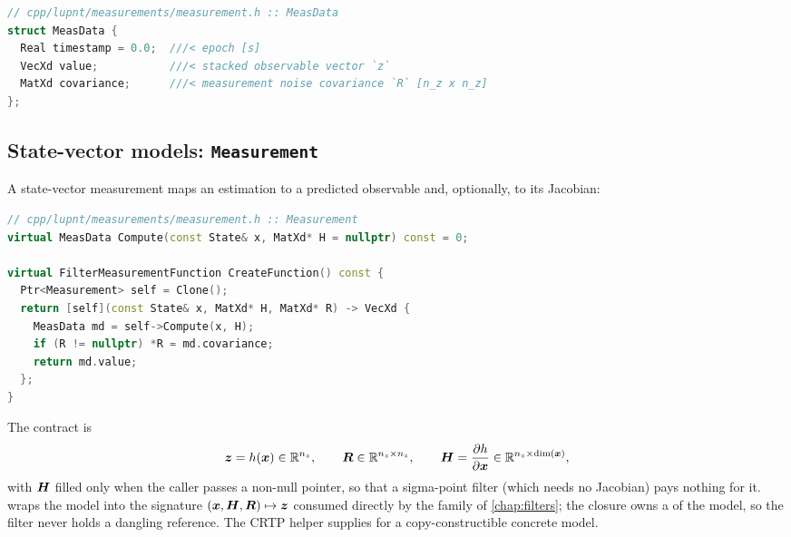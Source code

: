 \begin{lstlisting}[language=cpp, caption={The unified measurement data
  record.}, label={lst:meas-measdata}]
// cpp/lupnt/measurements/measurement.h :: MeasData
struct MeasData {
  Real timestamp = 0.0;  ///< epoch [s]
  VecXd value;           ///< stacked observable vector `z`
  MatXd covariance;      ///< measurement noise covariance `R` [n_z x n_z]
};
\end{lstlisting}

\subsection{State-vector models: \texttt{Measurement}}
\label{sec:meas-base}

A state-vector measurement maps an estimation  to a predicted
observable and, optionally, to its Jacobian:

\begin{lstlisting}[language=cpp, caption={The state-vector measurement
  interface and its filter adapter.}, label={lst:meas-base}]
// cpp/lupnt/measurements/measurement.h :: Measurement
virtual MeasData Compute(const State& x, MatXd* H = nullptr) const = 0;

virtual FilterMeasurementFunction CreateFunction() const {
  Ptr<Measurement> self = Clone();
  return [self](const State& x, MatXd* H, MatXd* R) -> VecXd {
    MeasData md = self->Compute(x, H);
    if (R != nullptr) *R = md.covariance;
    return md.value;
  };
}
\end{lstlisting}

The contract is
\begin{equation}
  \bm{z} = h(\bm{x}) \in \mathbb{R}^{n_z}, \qquad
  \bm{R} \in \mathbb{R}^{n_z\times n_z}, \qquad
  \bm{H} = \frac{\partial h}{\partial \bm{x}}
          \in \mathbb{R}^{n_z\times \dim(\bm{x})} ,
  \label{eq:meas-contract}
\end{equation}
with $\bm{H}$ filled only when the caller passes a non-null pointer, so that a
sigma-point filter (which needs no Jacobian) pays nothing for it.
 wraps the model into the
 signature
$(\bm{x}, \bm{H}, \bm{R}) \mapsto \bm{z}$ consumed directly by the
 family of \cref{chap:filters}; the closure owns a  of
the model, so the filter never holds a dangling reference. The
 CRTP helper supplies  for a
copy-constructible concrete model.

